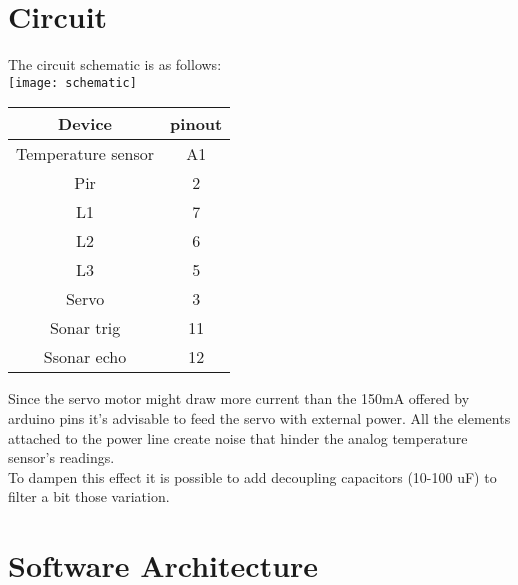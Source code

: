 \section{Circuit}
The circuit schematic is as follows:\\
\texttt{[image: schematic]}
\begin{center}
    \begin{tabular}{|c|c|}
        \hline
        Device             & pinout \\
        \hline
        \hline
        Temperature sensor & A1     \\
        \hline
        Pir                & 2      \\
        \hline
        L1                 & 7      \\
        \hline
        L2                 & 6      \\
        \hline
        L3                 & 5      \\
        \hline
        Servo              & 3      \\
        \hline
        Sonar trig         & 11     \\
        \hline
        Ssonar echo        & 12     \\
        \hline
    \end{tabular}
\end{center}
Since the servo motor might draw more current than the 150mA offered by arduino pins it's advisable to feed the servo with external power.
All the elements attached to the power line create noise that hinder the analog temperature sensor's readings.\\
To dampen this effect it is possible to add decoupling capacitors (10-100 uF) to filter a bit those variation.
\pagebreak
\section{Software Architecture}
